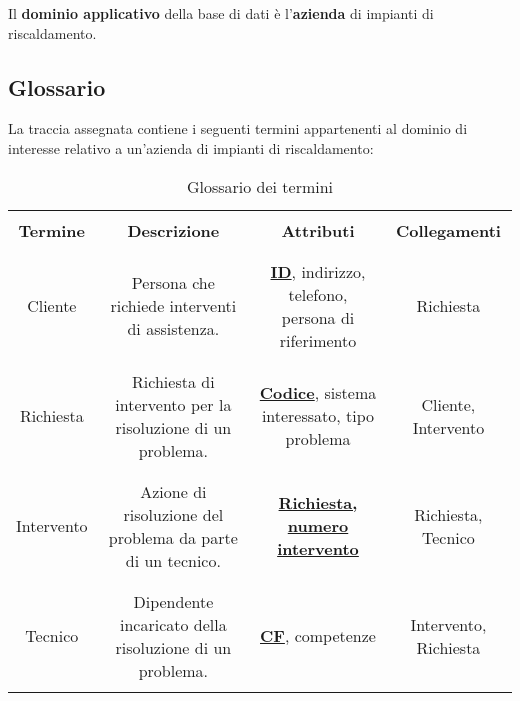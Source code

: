 \documentclass{article}
\begin{document}
Il \textbf{dominio applicativo} della base di dati è l'\textbf{azienda} di impianti di riscaldamento.


\subsection{Glossario}

La traccia assegnata contiene i seguenti termini appartenenti al dominio di interesse relativo a un'azienda di impianti di riscaldamento:

\begin{table}[h!]
    \centering
    \begin{adjustbox}{width=1\textwidth}
        \begin{tabular}{|c|c|c|c|}
            \hline &&& \\ 
            \textbf{Termine} & \textbf{Descrizione} & \textbf{Attributi} & \textbf{Collegamenti} \\ &&& \\ 
            \hline &&& \\ 
            Cliente & Persona che richiede interventi di assistenza. & \underline{\textbf{ID}}, indirizzo, telefono, persona di riferimento  & Richiesta \\ &&& \\
            \hline &&& \\ 
            Richiesta & Richiesta di intervento per la risoluzione di un problema. & \underline{\textbf{Codice}}, sistema interessato, tipo problema  & Cliente, Intervento\\ &&& \\ 
            \hline &&& \\ 
            Intervento & Azione di risoluzione del problema da parte di un tecnico. & \underline{\textbf{Richiesta, numero intervento}} & Richiesta, Tecnico\\ &&& \\ 
            \hline &&& \\ 
            Tecnico & Dipendente incaricato della risoluzione di un problema. & \underline{\textbf{CF}}, competenze & Intervento, Richiesta\\ &&& \\ 
            \hline
        \end{tabular}
    \end{adjustbox}
    \caption{Glossario dei termini}
    \label{tab:glossario}
\end{table}

\newpage
\end{document}
